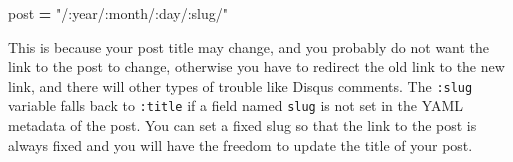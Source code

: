 \documentclass[12pt,]{krantz}
\makeatletter
\newenvironment{Shaded}{\begin{snugshade}}{\end{snugshade}}
\newcommand{\NormalTok}[1]{#1}
\newcommand{\OperatorTok}[1]{\textcolor[rgb]{0.81,0.36,0.00}{\textbf{#1}}}
\newcommand{\StringTok}[1]{\textcolor[rgb]{0.31,0.60,0.02}{#1}}
\newenvironment{kframe}{%
\medskip{}
\setlength{\fboxsep}{.8em}
 \def\at@end@of@kframe{}%
 \ifinner\ifhmode%
  \def\at@end@of@kframe{\end{minipage}}%
  \begin{minipage}{\columnwidth}%
 \fi\fi%
 \def\FrameCommand##1{\hskip\@totalleftmargin \hskip-\fboxsep
 \colorbox{shadecolor}{##1}\hskip-\fboxsep
     \hskip-\linewidth \hskip-\@totalleftmargin \hskip\columnwidth}%
 \MakeFramed {\advance\hsize-\width
   \@totalleftmargin\z@ \linewidth\hsize
   \@setminipage}}%
 {\par\unskip\endMakeFramed%
 \at@end@of@kframe}
\renewenvironment{Shaded}{\begin{kframe}}{\end{kframe}}
\theoremstyle{definition}
\theoremstyle{definition}
\theoremstyle{definition}
\theoremstyle{remark}
\makeatother
\begin{document}
\begin{itemize}
\begin{Shaded}
\begin{Highlighting}[]
\NormalTok{[permalinks]}
\NormalTok{    post }\OperatorTok{=} \StringTok{"/:year/:month/:day/:slug/"}
\end{Highlighting}
\end{Shaded}

  This is because your post title may change, and you probably do not
  want the link to the post to change, otherwise you have to redirect
  the old link to the new link, and there will other types of trouble
  like Disqus comments. The \texttt{:slug} variable falls back to
  \texttt{:title} if a field named \texttt{slug} is not set in the YAML
  metadata of the post. You can set a fixed slug so that the link to the
  post is always fixed and you will have the freedom to update the title
  of your post.


\end{itemize}
\end{document}
